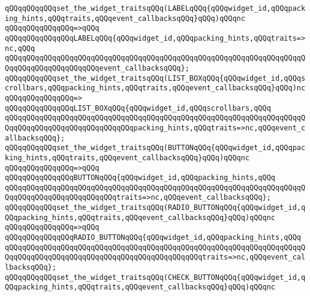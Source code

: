 \newline
\verb|qQQqqQQqqQQqset_the_widget_traitsqQQq(LABELqQQq{qQQqwidget_id,qQQqpacking_hints,qQQqtraits,qQQqevent_callbacksqQQq}qQQq)qQQqnc|\newline
\verb|qQQqqQQqqQQqqQQq=>qQQq|\newline
\verb|qQQqqQQqqQQqqQQqLABELqQQq{qQQqwidget_id,qQQqpacking_hints,qQQqtraits=>nc,qQQq|\newline
\verb|qQQqqQQqqQQqqQQqqQQqqQQqqQQqqQQqqQQqqQQqqQQqqQQqqQQqqQQqqQQqqQQqqQQqqQQqqQQqqQQqqQQqqQQqqQQqevent_callbacksqQQq};|\newline
\newline
\verb|qQQqqQQqqQQqset_the_widget_traitsqQQq(LIST_BOXqQQq{qQQqwidget_id,qQQqscrollbars,qQQqpacking_hints,qQQqtraits,qQQqevent_callbacksqQQq}qQQq)nc|\newline
\verb|qQQqqQQqqQQqqQQq=>|\newline
\verb|qQQqqQQqqQQqqQQqLIST_BOXqQQq{qQQqwidget_id,qQQqscrollbars,qQQq|\newline
\verb|qQQqqQQqqQQqqQQqqQQqqQQqqQQqqQQqqQQqqQQqqQQqqQQqqQQqqQQqqQQqqQQqqQQqqQQqqQQqqQQqqQQqqQQqqQQqqQQqqQQqpacking_hints,qQQqtraits=>nc,qQQqevent_callbacksqQQq};|\newline
\newline
\verb|qQQqqQQqqQQqset_the_widget_traitsqQQq(BUTTONqQQq{qQQqwidget_id,qQQqpacking_hints,qQQqtraits,qQQqevent_callbacksqQQq}qQQq)qQQqnc|\newline
\verb|qQQqqQQqqQQqqQQq=>qQQq|\newline
\verb|qQQqqQQqqQQqqQQqBUTTONqQQq{qQQqwidget_id,qQQqpacking_hints,qQQq|\newline
\verb|qQQqqQQqqQQqqQQqqQQqqQQqqQQqqQQqqQQqqQQqqQQqqQQqqQQqqQQqqQQqqQQqqQQqqQQqqQQqqQQqqQQqqQQqqQQqqQQqtraits=>nc,qQQqevent_callbacksqQQq};|\newline
\newline
\verb|qQQqqQQqqQQqset_the_widget_traitsqQQq(RADIO_BUTTONqQQq{qQQqwidget_id,qQQqpacking_hints,qQQqtraits,qQQqevent_callbacksqQQq}qQQq)qQQqnc|\newline
\verb|qQQqqQQqqQQqqQQq=>qQQq|\newline
\verb|qQQqqQQqqQQqqQQqRADIO_BUTTONqQQq{qQQqwidget_id,qQQqpacking_hints,qQQq|\newline
\verb|qQQqqQQqqQQqqQQqqQQqqQQqqQQqqQQqqQQqqQQqqQQqqQQqqQQqqQQqqQQqqQQqqQQqqQQqqQQqqQQqqQQqqQQqqQQqqQQqqQQqqQQqqQQqqQQqqQQqtraits=>nc,qQQqevent_callbacksqQQq};|\newline
\newline
\verb|qQQqqQQqqQQqset_the_widget_traitsqQQq(CHECK_BUTTONqQQq{qQQqwidget_id,qQQqpacking_hints,qQQqtraits,qQQqevent_callbacksqQQq}qQQq)qQQqnc|\newline
